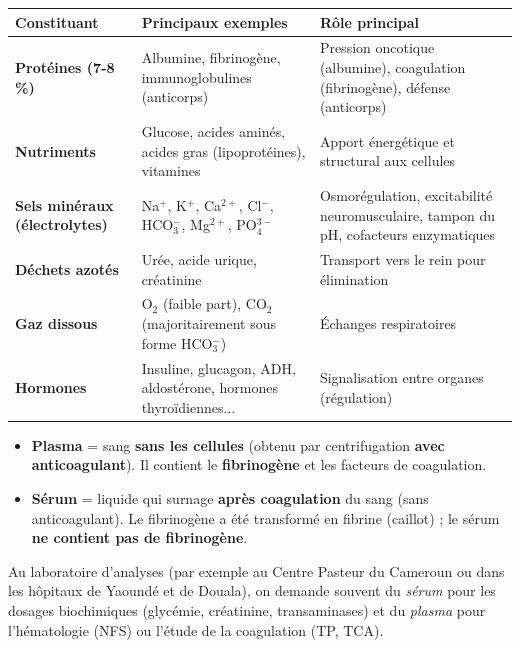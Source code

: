 \documentclass[11pt]{article}
\begin{document}
\begin{center}
\begin{tabularx}{\linewidth}{|l|X|X|}\hline
\rowcolor{popblueL}
\textbf{Constituant} & \textbf{Principaux exemples} & \textbf{Rôle principal} \\ \hline
\textbf{Protéines (7-8 \%)} & Albumine, fibrinogène, immunoglobulines (anticorps) & Pression oncotique (albumine), coagulation (fibrinogène), défense (anticorps) \\ \hline
\textbf{Nutriments} & Glucose, acides aminés, acides gras (lipoprotéines), vitamines & Apport énergétique et structural aux cellules \\ \hline
\textbf{Sels minéraux (électrolytes)} & Na$^+$, K$^+$, Ca$^{2+}$, Cl$^-$, HCO$_3^-$, Mg$^{2+}$, PO$_4^{3-}$ & Osmorégulation, excitabilité neuromusculaire, tampon du pH, cofacteurs enzymatiques \\ \hline
\textbf{Déchets azotés} & Urée, acide urique, créatinine & Transport vers le rein pour élimination \\ \hline
\textbf{Gaz dissous} & O$_2$ (faible part), CO$_2$ (majoritairement sous forme HCO$_3^-$) & Échanges respiratoires \\ \hline
\textbf{Hormones} & Insuline, glucagon, ADH, aldostérone, hormones thyroïdiennes... & Signalisation entre organes (régulation) \\ \hline
\end{tabularx}
\end{center}

\medskip
\begin{attention}
\begin{itemize}
    \item \textbf{Plasma} = sang \textbf{sans les cellules} (obtenu par centrifugation \textbf{avec anticoagulant}). Il contient le \textbf{fibrinogène} et les facteurs de coagulation.
    \item \textbf{Sérum} = liquide qui surnage \textbf{après coagulation} du sang (sans anticoagulant). Le fibrinogène a été transformé en fibrine (caillot) ; le sérum \textbf{ne contient pas de fibrinogène}.
\end{itemize}
Au laboratoire d'analyses (par exemple au Centre Pasteur du Cameroun ou dans les hôpitaux de Yaoundé et de Douala), on demande souvent du \emph{sérum} pour les dosages biochimiques (glycémie, créatinine, transaminases) et du \emph{plasma} pour l'hématologie (NFS) ou l'étude de la coagulation (TP, TCA).
\end{attention}
\end{document}
